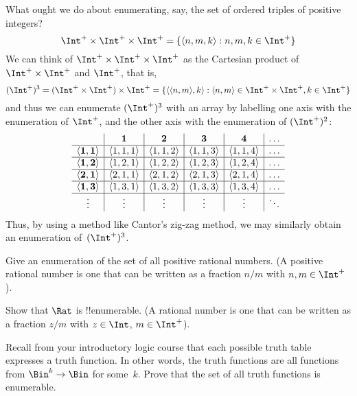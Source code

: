 \documentclass[../../../include/open-logic-section]{subfiles}
\begin{document}
\begin{explain}
What ought we do about enumerating, say, the set of ordered triples
of positive integers?
\[
\Int^+ \times \Int^+ \times \Int^+ = \Setabs{\tuple{n,m,k}}{n,m,k \in \Int^+}
\]
We can think of $\Int^+ \times \Int^+ \times \Int^+$ as the Cartesian
product of $\Int^+ \times \Int^+$ and $\Int^+$, that is,
\[
(\Int^+)^3 = (\Int^+ \times \Int^+) \times \Int^+ =
\Setabs{\tuple{\tuple{n,m},k}}{\tuple{n,m} \in \Int^+ \times \Int^+, k
  \in \Int^+ }
\]
and thus we can enumerate $(\Int^+)^3$ with an array by labelling one
axis with the enumeration of $\Int^+$, and the other axis with the
enumeration of $(\Int^+)^2$:
\[
\begin{array}{ c | c | c | c | c | c}
& \textbf 1 & \textbf 2 & \textbf 3 & \textbf 4 & \dots \\
\hline
\mathbf{\tuple{1,1}} & \tuple{1,1,1} & \tuple{1,1,2} & \tuple{1,1,3} & \tuple{1,1,4} & \dots \\
\hline
\mathbf{\tuple{1,2}} & \tuple{1,2,1} & \tuple{1,2,2} & \tuple{1,2,3} & \tuple{1,2,4} & \dots \\
\hline
\mathbf{\tuple{2,1}} & \tuple{2,1,1} & \tuple{2,1,2} & \tuple{2,1,3} & \tuple{2,1,4} & \dots \\
\hline
\mathbf{\tuple{1,3}} & \tuple{1,3,1} & \tuple{1,3,2} & \tuple{1,3,3} & \tuple{1,3,4} & \dots\\
\hline
\vdots & \vdots & \vdots & \vdots & \vdots & \ddots \\
\end{array}
\]
Thus, by using a method like Cantor's zig-zag method, we may
similarly obtain an enumeration of~$(\Int^+)^3$.
\end{explain}

\begin{prob}
Give an enumeration of the set of all positive rational numbers. (A
positive rational number is one that can be written as a fraction
$n/m$ with $n, m \in \Int^+$).
\end{prob}

\begin{prob}
Show that $\Rat$ is !!{enumerable}. (A rational number is one that can
be written as a fraction $z/m$ with $z \in \Int$, $m \in \Int^+$).
\end{prob}

\begin{prob}
Recall from your introductory logic course that each possible truth
table expresses a truth function. In other words, the truth functions
are all functions from $\Bin^k \to \Bin$ for some~$k$. Prove that the
set of all truth functions is enumerable.
\end{prob}
\end{document}
